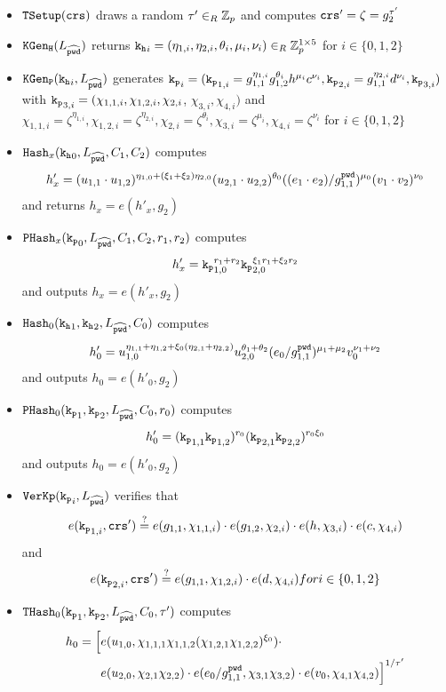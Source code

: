 \begin{itemize}
	\item $\mathtt{TSetup}(\mathtt{crs})$ draws a random $\tau'\in_R\mathbb{Z}_p$ and computes $\mathtt{crs}'=\zeta=g_2^{\tau'}$
	
	\item $\mathtt{KGen_H}(L_{\widehat{\mathtt{pwd}}})$ returns $\mathtt{k_h}_i=(\eta_{1,i},\eta_{2,i},\theta_i,\mu_i,\nu_i)\in_R\mathbb{Z}_p^{1\times 5}$ for $i\in\{0,1,2\}$
	
  \item $\mathtt{KGen_P}(\mathtt{k_h}_i, L_{\widehat{\mathtt{pwd}}})$ generates 
      $\mathtt{k_p}_i=(\mathtt{k_p}_{1,i}=g_{1,1}^{\eta_{1,i}} g_{1,2}^{\theta_i} h^{\mu_i} c^{\nu_i}, \mathtt{k_p}_{2,i}=g_{1,1}^{\eta_{2,i}} d^{\nu_i}, \mathtt{k_p}_{3,i})$ with
      $\mathtt{k_p}_{3,i}=(\chi_{1,1,i}, \chi_{1,2,i}, \chi_{2,i}$, $\chi_{3,i}, \chi_{4,i})$ and 
      $\chi_{1,1,i}={\zeta}^{\eta_{1,i}}, \chi_{1,2,i}={\zeta}^{\eta_{2,i}}, \chi_{2,i}={\zeta}^{\theta_i}, \chi_{3,i}={\zeta}^{\mu_i}, \chi_{4,i}={\zeta}^{\nu_i}$ for $i\in\{0,1,2\}$
  
  \item $\mathtt{Hash}_x(\mathtt{k_h}_0, L_{\widehat{\mathtt{pwd}}}, C_1, C_2)$ computes 
      \[h'_x=(u_{1,1}\cdot u_{1,2})^{\eta_{1,0}+(\xi_1+\xi_2)\eta_{2,0}} (u_{2,1}\cdot u_{2,2})^{\theta_0} ((e_1\cdot e_2)/g_{1,1}^{\mathtt{pwd}})^{\mu_0} (v_1\cdot v_2)^{\nu_0}\]
      and returns $h_x=e(h'_x,g_2)$
  \item $\mathtt{PHash}_x(\mathtt{k_p}_0, L_{\widehat{\mathtt{pwd}}}, C_1, C_2, r_1, r_2)$ computes 
      \[h'_x=\mathtt{k_p}_{1,0}^{r_1+r_2} \mathtt{k_p}_{2,0}^{\xi_1 r_1+\xi_2 r_2}\]
      and outputs $h_x=e(h'_x,g_2)$
  \item $\mathtt{Hash}_0(\mathtt{k_h}_1, \mathtt{k_h}_2, L_{\widehat{\mathtt{pwd}}}, C_0)$ computes 
      \[h'_0=u_{1,0}^{\eta_{1,1}+\eta_{1,2}+\xi_0(\eta_{2,1}+\eta_{2,2})} u_{2,0}^{\theta_1+\theta_2} (e_0/g_{1,1}^{\mathtt{pwd}})^{\mu_1+\mu_2} v_0^{\nu_1+\nu_2}\]
      and outputs $h_0=e(h'_0,g_2)$
  \item $\mathtt{PHash}_0(\mathtt{k_p}_1, \mathtt{k_p}_2, L_{\widehat{\mathtt{pwd}}}, C_0, r_0)$ computes 
      \[h'_0=(\mathtt{k_p}_{1,1}\mathtt{k_p}_{1,2})^{r_0} (\mathtt{k_p}_{2,1}\mathtt{k_p}_{2,2})^{r_0\xi_0}\]
      and outputs $h_0=e(h'_0,g_2)$
	
  \item $\mathtt{VerKp}(\mathtt{k_p}_i, L_{\widehat{\mathtt{pwd}}})$ verifies that 
      \[e(\mathtt{k_p}_{1,i}, \mathtt{crs}')\stackrel{?}{=} e(g_{1,1}, \chi_{1,1,i})\cdot e(g_{1,2}, \chi_{2,i})\cdot e(h, \chi_{3,i})\cdot e(c, \chi_{4,i})\]
      and
      \[e(\mathtt{k_p}_{2,i}, \mathtt{crs}') \stackrel{?}{=} e(g_{1,1}, \chi_{1,2,i})\cdot e(d, \chi_{4,i}) for i\in\{0,1,2\}\]

  \item $\mathtt{THash}_0(\mathtt{k_p}_1, \mathtt{k_p}_2, L_{\widehat{\mathtt{pwd}}}, C_0, \tau')$ computes 
      \begin{align*}        
        h_0 = \Big[ & e(u_{1,0}, \chi_{1,1,1}\chi_{1,1,2}(\chi_{1,2,1}\chi_{1,2,2})^{\xi_0})\cdot \\
        & e(u_{2,0}, \chi_{2,1}\chi_{2,2})\cdot e(e_0/g_{1,1}^{\mathtt{pwd}}, \chi_{3,1}\chi_{3,2})\cdot e(v_0, \chi_{4,1}\chi_{4,2}) \Big]^{1/\tau'}
      \end{align*}
			

\end{itemize}
